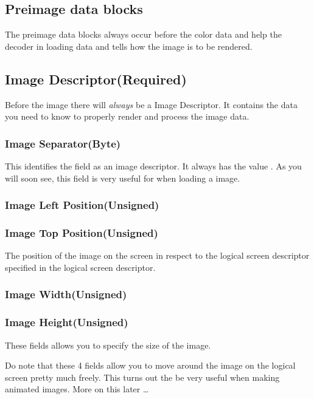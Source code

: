 \begin{refsection}
  \section{Preimage data blocks}

  The preimage data blocks always occur before the color data and help
  the decoder in loading data and tells how the image is to be
  rendered.

  \subsection{Image Descriptor(Required)}

  Before the image there will \textit{always} be a Image
  Descriptor. It contains the data you need to know to properly render
  and process the image data.

  \subsubsection{Image Separator(Byte)}

  This identifies the field as an image descriptor. It always has the
  value . As you will soon see, this field is very useful for
  when loading a \gif image.

  \subsubsection{Image Left Position(Unsigned)}
  \subsubsection{Image Top Position(Unsigned)}

  The position of the image on the screen in respect to the logical
  screen descriptor specified in the logical screen descriptor.

  \subsubsection{Image Width(Unsigned)}
  \subsubsection{Image Height(Unsigned)}

  These fields allows you to specify the size of the image.

  Do note that these 4 fields allow you to move around the image on
  the logical screen pretty much freely. This turns out the be very
  useful when making animated images. More on this later \dots


\end{refsection}
